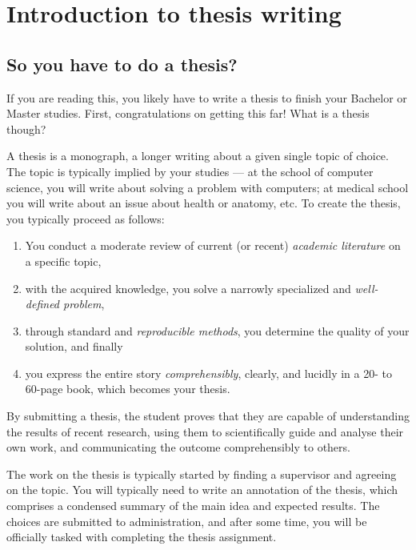 \chapter{Introduction to thesis writing}
\label{chap:refs}

\section{So you have to do a thesis?}


If you are reading this, you likely have to write a thesis to finish your Bachelor or Master studies. First, congratulations on getting this far! What is a thesis though?

A thesis is a monograph, a longer writing about a given single topic of choice. The topic is typically implied by your studies --- at the school of computer science, you will write about solving a problem with computers; at medical school you will write about an issue about health or anatomy, etc. To create the thesis, you typically proceed as follows:
\begin{enumerate}
\item You conduct a moderate review of current (or recent) \emph{academic literature} on a specific topic,
\item with the acquired knowledge, you solve a narrowly specialized and \emph{well-defined problem},
\item through standard and \emph{reproducible methods}, you determine the quality of your solution, and finally\item you express the entire story \emph{comprehensibly}, clearly, and lucidly in a 20- to 60-page book, which becomes your thesis.
\end{enumerate}

By submitting a thesis, the student proves that they are capable of understanding the results of recent research, using them to scientifically guide and analyse their own work, and communicating the outcome comprehensibly to others.

The work on the thesis is typically started by finding a supervisor and agreeing on the topic. You will typically need to write an annotation of the thesis, which comprises a condensed summary of the main idea and expected results. The choices are submitted to administration, and after some time, you will be officially tasked with completing the thesis assignment.

